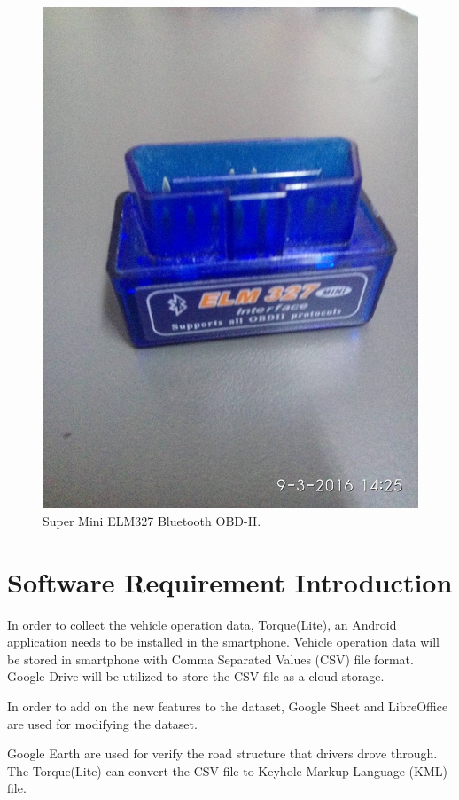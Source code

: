 \begin{figure}[hbt!]\centering
\includegraphics[height=.5\textheight]{image/ELM327}
\caption{Super Mini ELM327 Bluetooth OBD-II.}
\end{figure}

\section{Software Requirement Introduction}
In order to collect the vehicle operation data, Torque(Lite), an Android application needs to be installed in the smartphone. Vehicle operation data will be stored in smartphone with Comma Separated Values (CSV) file format. Google Drive will be utilized to store the CSV file as a cloud storage.

In order to add on the new features to the dataset, Google Sheet and LibreOffice are used for modifying the dataset. 

Google Earth are used for verify the road structure that drivers drove through. The Torque(Lite) can convert the CSV file to Keyhole Markup Language (KML) file.
 
